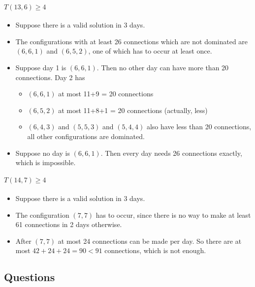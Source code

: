 \documentclass[a4paper]{article}
\begin{document}
\paragraph{$T(13,6) \geq  4$}

\begin{itemize}

\item
  Suppose there is a valid solution in 3 days.
\item
  The configurations with at least 26 connections which are not
  dominated are $(6,6,1)$ and $(6,5,2)$, one of which has
  to occur at least once.
\item
  Suppose day 1 is $(6,6,1)$. Then no other day can have more
  than 20 connections. Day 2 has

  \begin{itemize}

  \item
    $(6,6,1)$ at most 11+9 = 20 connections
  \item
    $(6,5,2)$ at most 11+8+1 = 20 connections (actually, less)
  \item
    $(6,4,3)$ and $(5,5,3)$ and $(5,4,4)$ also have
    less than 20 connections, all other configurations are dominated.
  \end{itemize}
\item
  Suppose no day is $(6,6,1)$. Then every day needs 26
  connections exactly, which is impossible.
\end{itemize}

\paragraph{$T(14,7)\geq 4$}

\begin{itemize}

\item
  Suppose there is a valid solution in 3 days.
\item
  The configuration $(7,7)$ has to occur, since there is no way
  to make at least 61 connections in 2 days otherwise.
\item
  After $(7,7)$ at most 24 connections can be made per day. So
  there are at most $42+24+24=90<91$
  connections, which is not enough.
\end{itemize}

\subsection{Questions}\label{questions}
\end{document}
